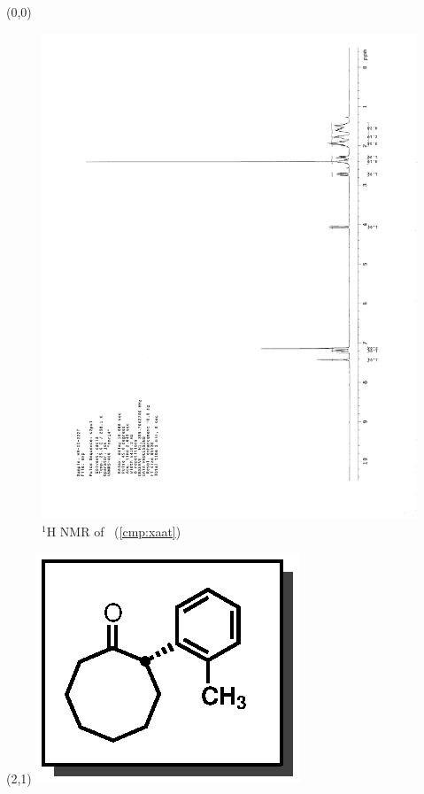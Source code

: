 \begin{textblock}{20}(0,0)
\begin{figure}[htb]
\caption{$^1$H NMR of \CMPxaat\ (\ref{cmp:xaat})}
\includegraphics[scale=0.75, trim = 0mm 0mm 0mm 5mm,
clip]{chp_asymmetric/images/nmr/xaatH}
\vspace{-100pt}
\end{figure}
\end{textblock}
\begin{textblock}{1}(2,1)
\includegraphics[scale=0.8, angle=90]{chp_asymmetric/images/xaat}
\end{textblock}
